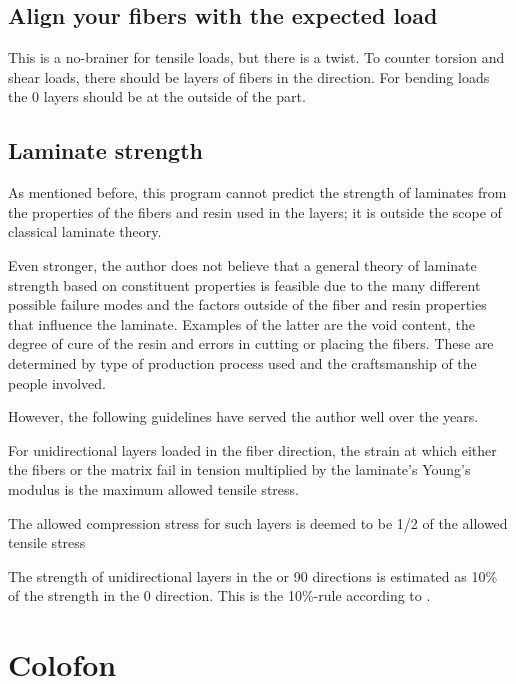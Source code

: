 \documentclass[a4paper,landscape,oneside,11pt,twocolumn]{memoir}
\begin{document}
\section{Align your fibers with the expected load}

This is a no-brainer for tensile loads, but there is a twist. To counter
torsion and shear loads, there should be layers of fibers in the \textdegree{} direction.  For bending loads the 0\textdegree{} layers should
be at the outside of the part.


\section{Laminate strength}

As mentioned before, this program cannot predict the strength of laminates
from the properties of the fibers and resin used in the layers; it is outside
the scope of classical laminate theory.

Even stronger, the author does not believe that a general theory of laminate
strength based on constituent properties is feasible due to the many different
possible failure modes and the factors outside of the fiber and resin
properties that influence the laminate.  Examples of the latter are the void
content, the degree of cure of the resin and errors in cutting or placing the
fibers. These are determined by type of production process used and the
craftsmanship of the people involved.

However, the following guidelines have served the author well over the years.

For unidirectional layers loaded in the fiber direction, the strain at which
either the fibers or the matrix fail in tension multiplied by the laminate's
Young's modulus is the maximum allowed tensile stress.

The allowed compression stress for such layers is deemed to be 1/2 of the
allowed tensile stress

The strength of unidirectional layers in the \textdegree{} or
90\textdegree{} directions is estimated as 10\% of the strength in the
0\textdegree{} direction. This is the 10\%-rule according to
\citet{1992WeiEn..52...29H}.

%

\chapter{Colofon}
\end{document}
